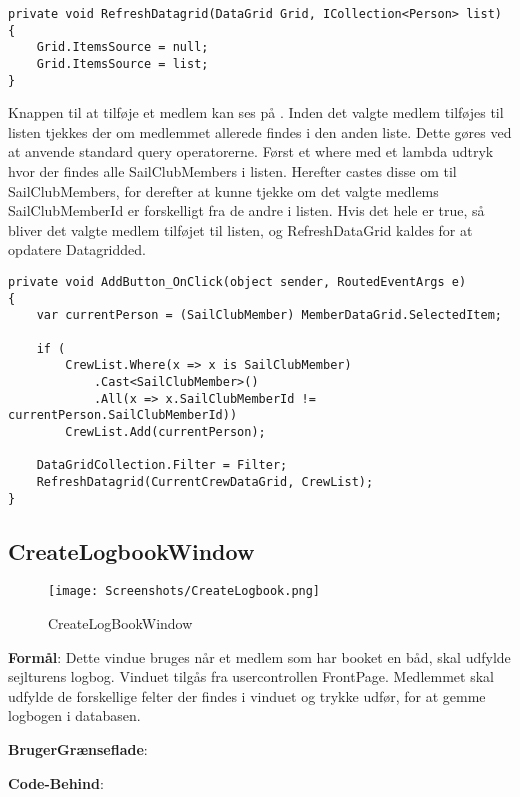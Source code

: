 \begin{lstlisting}[frame=single, caption=Refresh Datagrid, label=RefreshDatagrid]
private void RefreshDatagrid(DataGrid Grid, ICollection<Person> list)
{
    Grid.ItemsSource = null;
    Grid.ItemsSource = list;
}
\end{lstlisting}

Knappen til at tilføje et medlem kan ses på .
Inden det valgte medlem tilføjes til listen tjekkes der om medlemmet allerede findes i den anden liste. 
Dette gøres ved at anvende standard query operatorerne. 
Først et where med et lambda udtryk hvor der findes alle SailClubMembers i listen. 
Herefter castes disse om til SailClubMembers, for derefter at kunne tjekke om det valgte medlems SailClubMemberId er forskelligt fra de andre i listen. 
Hvis det hele er true, så bliver det valgte medlem tilføjet til listen, og RefreshDataGrid kaldes for at opdatere Datagridded.

\begin{lstlisting}[frame=single, caption=Add Member, label=AddMember]
private void AddButton_OnClick(object sender, RoutedEventArgs e)
{
    var currentPerson = (SailClubMember) MemberDataGrid.SelectedItem;

    if (
        CrewList.Where(x => x is SailClubMember)
            .Cast<SailClubMember>()
            .All(x => x.SailClubMemberId != currentPerson.SailClubMemberId))
        CrewList.Add(currentPerson);

    DataGridCollection.Filter = Filter; 
    RefreshDatagrid(CurrentCrewDataGrid, CrewList);
}
\end{lstlisting}

\subsection{CreateLogbookWindow}

\begin{wrapfigure}{r}{0.5\textwidth}
    \label{img:login_interface}
    \vspace{-20pt}
    \begin{center}
        \texttt{[image: Screenshots/CreateLogbook.png]}
    \end{center}
    \vspace{-15pt}
    \caption{CreateLogBookWindow}
    \vspace{-30pt}
\end{wrapfigure}

\textbf{Formål}: Dette vindue bruges når et medlem som har booket en båd, skal udfylde sejlturens logbog. Vinduet tilgås fra usercontrollen FrontPage. Medlemmet skal udfylde de forskellige felter der findes i vinduet og trykke udfør, for at gemme logbogen i databasen.

\textbf{BrugerGrænseflade}: 

\textbf{Code-Behind}:



